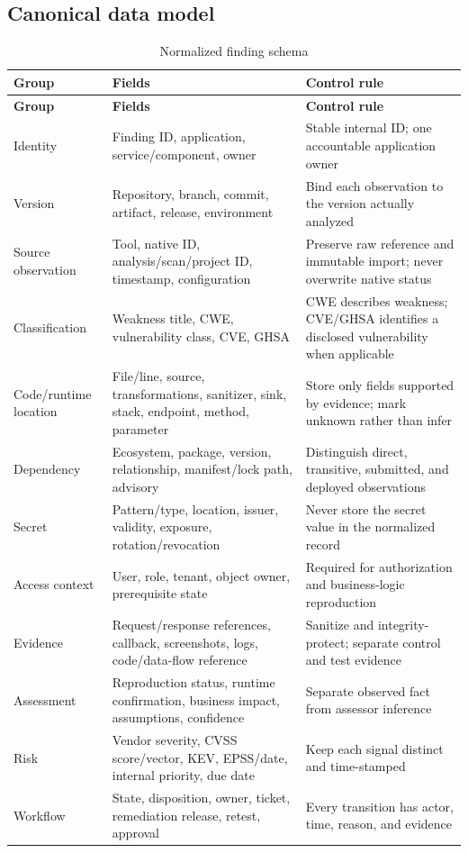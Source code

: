 \documentclass[11pt,letterpaper]{article}
\begin{document}
\subsection{Canonical data model}

\begin{longtable}{@{}L{1.35in}L{1.9in}L{3.3in}@{}}
\caption{Normalized finding schema}\label{tab:finding-schema}\\
\toprule
\textbf{Group} & \textbf{Fields} & \textbf{Control rule} \\
\midrule
\endfirsthead
\toprule
\textbf{Group} & \textbf{Fields} & \textbf{Control rule} \\
\midrule
\endhead
Identity & Finding ID, application, service/component, owner & Stable internal ID; one accountable application owner \\
Version & Repository, branch, commit, artifact, release, environment & Bind each observation to the version actually analyzed \\
Source observation & Tool, native ID, analysis/scan/project ID, timestamp, configuration & Preserve raw reference and immutable import; never overwrite native status \\
Classification & Weakness title, CWE, vulnerability class, CVE, GHSA & CWE describes weakness; CVE/GHSA identifies a disclosed vulnerability when applicable \\
Code/runtime location & File/line, source, transformations, sanitizer, sink, stack, endpoint, method, parameter & Store only fields supported by evidence; mark unknown rather than infer \\
Dependency & Ecosystem, package, version, relationship, manifest/lock path, advisory & Distinguish direct, transitive, submitted, and deployed observations \\
Secret & Pattern/type, location, issuer, validity, exposure, rotation/revocation & Never store the secret value in the normalized record \\
Access context & User, role, tenant, object owner, prerequisite state & Required for authorization and business-logic reproduction \\
Evidence & Request/response references, callback, screenshots, logs, code/data-flow reference & Sanitize and integrity-protect; separate control and test evidence \\
Assessment & Reproduction status, runtime confirmation, business impact, assumptions, confidence & Separate observed fact from assessor inference \\
Risk & Vendor severity, CVSS score/vector, KEV, EPSS/date, internal priority, due date & Keep each signal distinct and time-stamped \\
Workflow & State, disposition, owner, ticket, remediation release, retest, approval & Every transition has actor, time, reason, and evidence \\
\bottomrule
\end{longtable}
\end{document}
